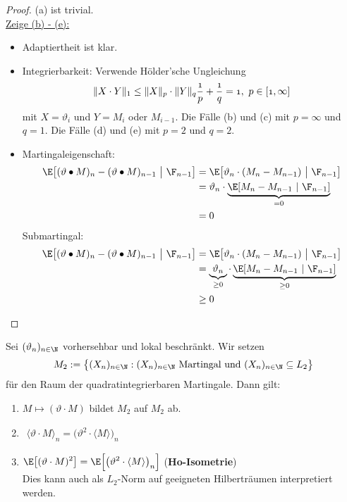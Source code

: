 \begin{proof}
(a) ist trivial.\\

\underline{Zeige (b) - (e):}
\begin{itemize}
\item Adaptiertheit ist klar.
\item Integrierbarkeit: Verwende Hölder'sche Ungleichung
\begin{align*}
\Vert X\cdot Y\Vert_1\leq\Vert X\Vert_p\cdot\Vert Y\Vert_q\mit\frac{1}{p}+\frac{1}{q}=1,~p\in[1,\infty]
\end{align*}
mit $X=\vartheta_i$ und $Y=M_i$ oder $M_{i-1}$. Die Fälle (b) und (c) mit $p=\infty$ und $q=1$. Die Fälle (d) und (e) mit $p=2$ und $q=2$.
\item Martingaleigenschaft:
\begin{align*}
\E\big[(\vartheta\bullet M)_n-(\vartheta\bullet M)_{n-1}~\big|~\F_{n-1}\big]
&=\E\big[\vartheta_n\cdot(M_n-M_{n-1})~\big|~\F_{n-1}\big]\\
&=\vartheta_n\cdot\underbrace{\E[M_n-M_{n-1}~|~\F_{n-1}]}_{=0}\\
&=0
\end{align*}
Submartingal:
\begin{align*}
\E\big[(\vartheta\bullet M)_n-(\vartheta\bullet M)_{n-1}~\big|~\F_{n-1}\big]
&=\E\big[\vartheta_n\cdot(M_n-M_{n-1})~\big|~\F_{n-1}\big]\\
&=\underbrace{\vartheta_n}_{\geq0}\cdot\underbrace{\E[M_n-M_{n-1}~|~\F_{n-1}]}_{\geq0}\\
&\geq0
\end{align*}
\end{itemize}
\end{proof}

\begin{proposition}\label{prop2.6}
Sei $(\vartheta_n)_{n\in\N}$ vorhersehbar und lokal beschränkt. Wir setzen
\begin{align*}
M_2:=\big\lbrace (X_n)_{n\in\N}:(X_n)_{n\in\N}\text{ Martingal und }(X_n)_{n\in\N}\subseteq L_2\big\rbrace
\end{align*}
für den Raum der quadratintegrierbaren Martingale. Dann gilt:
\begin{enumerate}[label=(\alph*)]
\item $M\mapsto(\vartheta\cdot M)$ bildet $M_2$ auf $M_2$ ab.
\item $\begin{aligned}
\langle\vartheta\cdot M\rangle_n=\big(\vartheta^2\cdot\langle M\rangle\big)_n
\end{aligned}$
\item $\begin{aligned}
\E\big[(\vartheta\cdot M)^2\big]=\E\Big[\big(\vartheta^2\cdot\langle M\rangle\big)_n\Big]
\end{aligned}$ (\textbf{Ho-Isometrie})\\
Dies kann auch als $L_2$-Norm auf geeigneten Hilberträumen interpretiert werden.
\end{enumerate}
\end{proposition}


